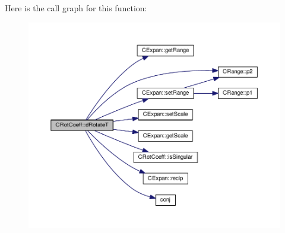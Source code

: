 Here is the call graph for this function\-:\nopagebreak
\begin{figure}[H]
\begin{center}
\leavevmode
\includegraphics[width=350pt]{classCRotCoeff_a888c0b53003ee5da4684bf066ed9469f_cgraph}
\end{center}
\end{figure}


